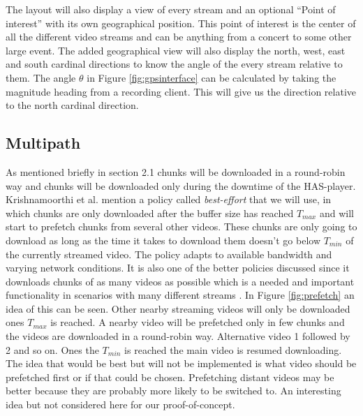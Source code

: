 \documentclass[9pt,a4paper]{acmproc}
\begin{document}
The layout will also display a view of every stream and an optional “Point of interest” with its own geographical position. This point of interest is the center of all the different video streams and can be anything from a concert to some other large event. The added geographical view will also display the north, west, east and south cardinal directions to know the angle of the every stream relative to them. The angle $\theta$ in Figure \ref{fig:gpsinterface} can be calculated by taking the magnitude heading from a recording client. This will give us the direction relative to the north cardinal direction.

\subsection{Multipath}

As mentioned briefly in section 2.1 chunks will be downloaded in a round-robin way and chunks will be downloaded only during the downtime of the HAS-player. Krishnamoorthi et al. \cite{bandawarePrefetch} mention a policy called \textit{best-effort} that we will use, in which chunks are only downloaded after the buffer size has reached $T_{max}$ and will start to prefetch chunks from several other videos. These chunks are only going to download as long as the time it takes to download them doesn't go below $T_{min}$ of the currently streamed video. The policy adapts to available bandwidth and varying network conditions. It is also one of the better policies discussed since it downloads chunks of as many videos as possible which is a needed and important functionality in  scenarios with many different streams \cite{bandawarePrefetch}. In Figure \ref{fig:prefetch} an idea of this can be seen. Other nearby streaming videos will only be downloaded ones $T_{max}$ is reached. A nearby video will be prefetched only in few chunks and the videos are downloaded in a round-robin way. Alternative video 1 followed by 2 and so on. Ones the $T_{min}$ is reached the main video is resumed downloading. The idea that would be best but will not be implemented is what video should be prefetched first or if that could be chosen. Prefetching distant videos may be better because they are probably more likely to be switched to. An interesting idea but not considered here for our proof-of-concept.
\end{document}
